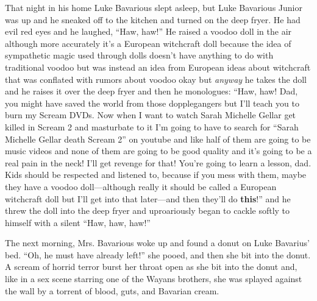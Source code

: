 That night in his home Luke Bavarious slept asleep, but Luke
Bavarious Junior was up and he sneaked off to the kitchen and
turned on the deep fryer. He had evil red eyes and he laughed,
``Haw, haw!'' He raised a voodoo doll in the air although
more accurately it's a European witchcraft doll because the
idea of sympathetic magic used through dolls doesn't have
anything to do with traditional voodoo but was instead an idea from
European ideas about witchcraft that was conflated with rumors
about voodoo okay but {\em anyway} he takes the doll and he raises it
over the deep fryer and then he monologues: ``Haw, haw! Dad,
you might have saved the world from those dopplegangers but
I'll teach you to burn my Scream DVDs. Now when I want to
watch Sarah Michelle Gellar get killed in Scream 2 and masturbate
to it I'm going to have to search for ``Sarah Michelle
Gellar death Scream 2'' on youtube and like half of them are
going to be music videos and none of them are going to be good
quality and it's going to be a real pain in the neck!
I'll get revenge for that! You're going to learn a
lesson, dad. Kids should be respected and listened to, because if
you mess with them, maybe they have a voodoo doll---although
really it should be called a European witchcraft doll but
I'll get into that later---and then they'll do
{\bf this}!'' and he threw the doll into the deep fryer and
uproariously began to cackle softly to himself with a silent
``Haw, haw, haw!''



The next morning, Mrs. Bavarious woke up and found a donut on Luke
Bavarius' bed. ``Oh, he must have already left!''
she pooed, and then she bit into the donut. A scream of horrid
terror burst her throat open as she bit into the donut and, like in
a sex scene starring one of the Wayans brothers, she was splayed
against the wall by a torrent of blood, guts, and Bavarian cream. 

 





